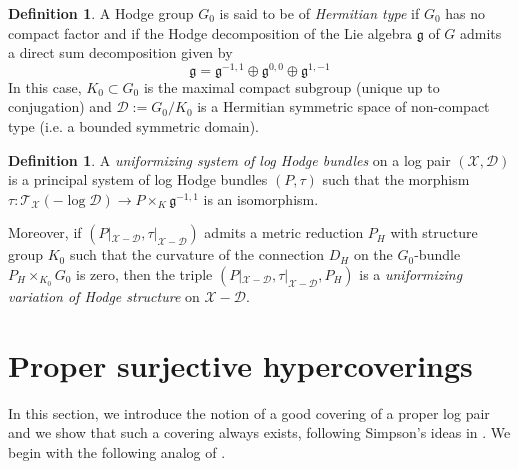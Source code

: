 \documentclass[a4paper]{amsart}
\theoremstyle{definition}
\newtheorem{definition}[theorem]{Definition}
\begin{document}
\begin{definition}
A Hodge group $G_0$ is said to be of \emph{Hermitian type} if $G_0$ has no compact factor and if the Hodge decomposition of the Lie algebra $\mathfrak{g}$ of $G$ admits a direct sum decomposition given by
\[
\mathfrak{g}=\mathfrak{g}^{-1,1}\oplus\mathfrak{g}^{0,0}\oplus\mathfrak{g}^{1,-1}
\]
In this case, $K_0\subset G_0$ is the maximal compact subgroup (unique up to conjugation) and $\mathcal{D}:=G_0/K_0$ is a Hermitian symmetric space of non-compact type (i.e. a bounded symmetric domain).
\end{definition}

\begin{definition}\label{Uniformizng VHS}
A \emph{uniformizing system of log Hodge bundles} on a log pair $(\mathscr{X},\mathscr{D})$ is a principal system of log Hodge bundles $(P,\tau)$ such that the morphism $\tau:\mathcal{T}_{\mathscr{X}}(-\log \mathscr{D})\to P\times_K\mathfrak{g}^{-1,1}$ is an isomorphism. 

Moreover, if $(P|_{\mathscr{X}-\mathscr{D}},\tau|_{\mathscr{X}-\mathscr{D}})$ admits a metric reduction $P_H$ with structure group $K_0$ such that the curvature of the connection $D_H$ on the $G_0$-bundle $P_H\times_{K_0}G_0$ is zero, then the triple $(P|_{\mathscr{X}-\mathscr{D}},\tau|_{\mathscr{X}-\mathscr{D}},P_H)$ is a \emph{uniformizing variation of Hodge structure} on $\mathscr{X}-\mathscr{D}$.
\end{definition}


\section{Proper surjective hypercoverings}

In this section, we introduce the notion of a good covering of a proper log pair and we show that such a covering always exists, following Simpson's ideas in \cite[Section 5]{simpsonstacks}.
We begin with the following analog of \cite[Theorem 5.4]{simpsonstacks}.
\end{document}
